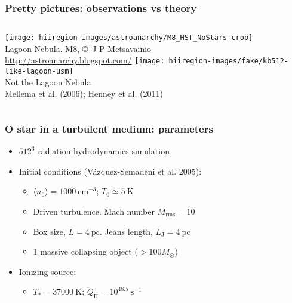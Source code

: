 \documentclass{beamer}
\newcommand\Ref[1]{\textcolor{white!70!black!90!yellow}{#1}}
\begin{document}
\begin{frame}
  \frametitle{Pretty pictures: observations vs theory}
  \begin{columns}
    \texttt{[image: hiiregion-images/astroanarchy/M8\_HST\_NoStars-crop]}\\
    \tiny
    \smallskip
    Lagoon Nebula, M8, \copyright\, J-P Metsavainio\\ \url{http://astroanarchy.blogspot.com/}
    \texttt{[image: hiiregion-images/fake/kb512-like-lagoon-usm]}\\
    \tiny
    \smallskip
    \alert{Not} the Lagoon Nebula\\
    \Ref{Mellema et al. (2006)}; \Ref{Henney et al. (2011)}
  \end{columns}
\end{frame}

\begin{frame}\frametitle{O star in a turbulent medium: parameters}
\linespread{1.3}\selectfont
\begin{itemize}
\item $512^3$ radiation-hydrodynamics simulation
\item Initial conditions (\Ref{V\'azquez-Semadeni et al. 2005}):
\begin{itemize}
  \item $\langle n_0 \rangle = 1000~\mathrm{cm}^{-3}$; $T_0 \simeq 5~\mathrm{K}$
  \item Driven turbulence. Mach number $M_\mathrm{rms} = 10$
  \item Box size, $L = 4~\mathrm{pc}$. Jeans length, $L_\mathrm{J} = 4~\mathrm{pc}$ 
  \item 1 massive collapsing object (\(> 100 M_\odot\))
\end{itemize}
\item Ionizing source:
\begin{itemize}
  \item $T_* = 37000~\mathrm{K}$; $Q_\mathrm{H} = 10^{48.5}~\mathrm{s}^{-1}$
\end{itemize}
\end{itemize}
\end{frame}

\newlength\maxheight
\setlength\maxheight{0.8\textheight}
\end{document}
